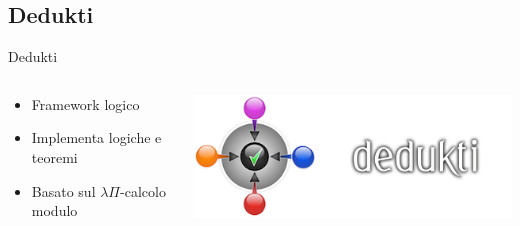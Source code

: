 \documentclass{beamer}
\begin{document}

\subsection{Dedukti}
\begin{frame}{Dedukti}
\begin{columns}

\begin{column}{.5\textwidth}
\begin{itemize}
  \item Framework logico
  \vspace{1.5em}
  \item Implementa logiche e teoremi
  \vspace{1.5em}
  \item Basato sul $\lambda\Pi$-calcolo modulo
\end{itemize}
\end{column}

\begin{column}{.5\textwidth}
\includegraphics[scale=1]{dedukti2.png}
\end{column}
\end{columns}


\end{frame}
\end{document}
